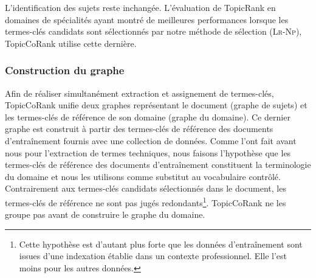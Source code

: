       L'identification des sujets reste inchangée. L'évaluation de TopicRank en
      domaines de spécialités ayant montré de meilleures performances lorsque
      les termes-clés candidats sont sélectionnés par notre méthode de sélection
      (\textsc{Lr-Np}), TopicCoRank utilise cette dernière.

      \subsubsection{Construction du graphe}
      \label{subsubsec:main-domain_specific_keyphrase_annotation-supervised_automatic_keyphrase_extraction-topiccorank-graph_construction}
        Afin de réaliser simultanément extraction et assignement de termes-clés,
        TopicCoRank unifie deux graphes représentant le document (graphe de
        sujets) et les termes-clés de référence de son domaine (graphe du
        domaine). Ce dernier graphe est construit à partir des termes-clés de
        référence des documents d'entraînement fournis avec une collection de
        données. Comme  l'ont
        fait avant nous pour l'extraction de termes techniques, nous faisons
        l'hypothèse que les termes-clés de référence des documents
        d'entraînement constituent la terminologie du domaine et nous les
        utilisons comme substitut au vocabulaire contrôlé. Contrairement aux
        termes-clés candidats sélectionnés dans le document, les termes-clés de
        référence ne sont pas jugés redondants\footnote{Cette hypothèse est
        d'autant plus forte que les données d'entraînement sont issues d'une
        indexation établie dans un contexte professionnel. Elle l'est moins pour
        les autres données.}. TopicCoRank ne les groupe pas avant de construire
        le graphe du domaine.

